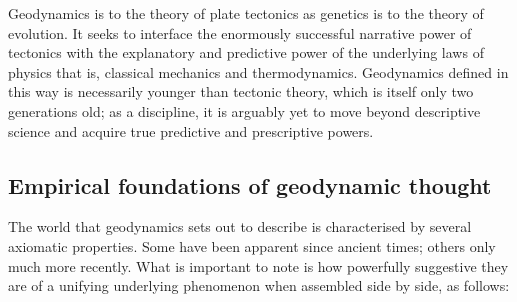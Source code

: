 \documentclass[letterpaper,10pt,english]{jupyterBook}
\begin{document}
\sphinxAtStartPar
Geodynamics is to the theory of plate tectonics as genetics is to the theory of evolution. It seeks to interface the enormously successful narrative power of tectonics with the explanatory and predictive power of the underlying laws of physics \sphinxhyphen{} that is, classical mechanics and thermodynamics. Geodynamics defined in this way is necessarily younger than tectonic theory, which is itself only two generations old; as a discipline, it is arguably yet to move beyond descriptive science and acquire true predictive and prescriptive powers.


\subsection{Empirical foundations of geodynamic thought}
\label{\detokenize{content/chapter_01_background/main:empirical-foundations-of-geodynamic-thought}}
\sphinxAtStartPar
The world that geodynamics sets out to describe is characterised by several axiomatic properties. Some have been apparent since ancient times; others only much more recently. What is important to note is how powerfully suggestive they are of a unifying underlying phenomenon when assembled side by side, as follows:
\end{document}
